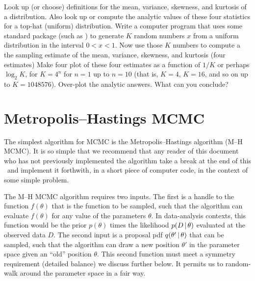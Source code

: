 \documentclass[12pt,twoside,pdftex]{article}
\newcommand{\data}{D}
\newcommand{\pars}{\theta}
\begin{document}
\begin{problem}
Look up (or choose) definitions for the mean, variance, skewness,
and kurtosis of a distribution.
Also look up or compute the analytic values of these four statistics
for a top-hat (uniform) distribution.
Write a computer program that uses some standard package (such as
)
to generate $K$ random numbers
$x$ from a uniform distribution in the interval $0<x<1$.
Now use those $K$ numbers to compute a the sampling estimate of the
mean, variance, skewness, and kurtosis (four estimates)
Make four plot of these four estimates as a function of $1/K$ or
perhaps $\log_2 K$, for $K=4^n$ for $n=1$ up to $n=10$ (that is,
$K=4$, $K=16$, and so on up to $K=1048576$).
Over-plot the analytic answers.
What can you conclude?
\end{problem}

\section{Metropolis--Hastings MCMC}

The simplest algorithm for MCMC is the Metropolis--Hastings algorithm (M--H MCMC).
It is so simple that we recommend that any reader of this document
  who has not previously implemented the algorithm take a break at the end
  of this \sectionname\ and implement it forthwith, in a short piece of computer code,
  in the context of some simple problem.

The M--H MCMC algorithm requires two inputs.
The first is a handle to the function $f(\pars)$ that is the function to be sampled,
  such that the algorithm can evaluate $f(\pars)$ for any value of the parameters $\pars$.
In data-analysis contexts,
  this function would be the prior $p(\pars)$ times the likelihood $p(\data\given\pars)$
  evaluated at the observed data $\data$.
The second input is a proposal pdf $q(\pars'\given\pars)$ that can be sampled,
  such that the algorithm can draw a new position $\pars'$ in the parameter space
  given an ``old'' position $\pars$.
This second function must meet a symmetry requirement (detailed
  balance) we discuss further below.
It permits us to random-walk around the parameter space in a fair way.
\end{document}
